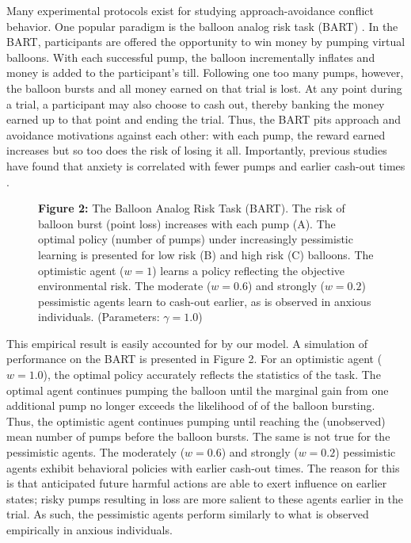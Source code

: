 \documentclass[11pt]{article} %
\begin{document}
Many experimental protocols exist for studying approach-avoidance conflict behavior. One popular paradigm is the balloon analog risk task (BART) \citep{Lejuez2002}. In the BART, participants are offered the opportunity to win money by pumping virtual balloons. With each successful pump, the balloon incrementally inflates and money is added to the participant's till. Following one too many pumps, however, the balloon bursts and all money earned on that trial is lost. At any point during a trial, a participant may also choose to cash out, thereby banking the money earned up to that point and ending the trial. Thus, the BART pits approach and avoidance motivations against each other: with each pump, the reward earned increases but so too does the risk of losing it all. Importantly, previous studies have found that anxiety is correlated with fewer pumps and earlier cash-out times \citep{Maner2007, ramirez2015}.

\begin{figure}
  \centerline{%
  }
  \par \textbf{Figure 2:} The Balloon Analog Risk Task (BART). The risk of balloon burst (point loss) increases with each pump (A). The optimal policy (number of pumps) under increasingly pessimistic learning is presented for low risk (B) and high risk (C) balloons. The optimistic agent ($w=1$) learns a policy reflecting the objective environmental risk. The moderate ($w=0.6$) and strongly ($w=0.2$) pessimistic agents learn to cash-out earlier, as is observed in anxious individuals. (Parameters: $\gamma = 1.0$)
\end{figure}

This empirical result is easily accounted for by our model. A simulation of performance on the BART is presented in Figure 2. For an optimistic agent ($w=1.0$), the optimal policy accurately reflects the statistics of the task. The optimal agent continues pumping the balloon until the marginal gain from one additional pump no longer exceeds the likelihood of of the balloon bursting. Thus, the optimistic agent continues pumping until reaching the (unobserved) mean number of pumps before the balloon bursts. The same is not true for the pessimistic agents. The moderately ($w=0.6$) and strongly ($w=0.2$) pessimistic agents exhibit behavioral policies with earlier cash-out times. The reason for this is that anticipated future harmful actions are able to exert influence on earlier states; risky pumps resulting in loss are more salient to these agents earlier in the trial. As such, the pessimistic agents perform similarly to what is observed empirically in anxious individuals.
\end{document}
